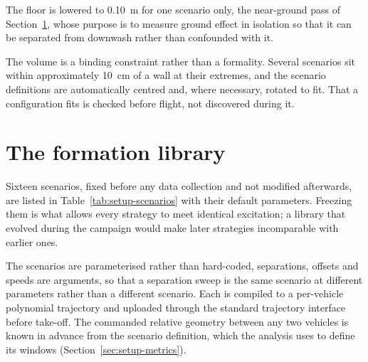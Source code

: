 The floor is lowered to \SI{0.10}{\metre} for one scenario only, the near-ground pass of
Section~\ref{sec:setup-scenarios}, whose purpose is to measure ground effect in isolation so that
it can be separated from downwash rather than confounded with it.

The volume is a binding constraint rather than a formality. Several scenarios sit within
approximately \SI{10}{\centi\metre} of a wall at their extremes, and the scenario definitions are
automatically centred and, where necessary, rotated to fit. That a configuration fits is checked
before flight, not discovered during it.


\section{The formation library}
\label{sec:setup-scenarios}

Sixteen scenarios, fixed before any data collection and not modified afterwards, are listed in
Table~\ref{tab:setup-scenarios} with their default parameters. Freezing them is
what allows every strategy to meet identical excitation; a library that evolved during the campaign
would make later strategies incomparable with earlier ones.

The scenarios are parameterised rather than hard-coded, separations, offsets and speeds are
arguments, so that a separation sweep is the same scenario at different parameters rather than
a different scenario. Each is compiled to a per-vehicle polynomial trajectory and uploaded through
the standard trajectory interface before take-off. The commanded relative geometry between any two vehicles is known in advance from
the scenario definition, which the analysis uses to define its windows
(Section~\ref{sec:setup-metrics}).

